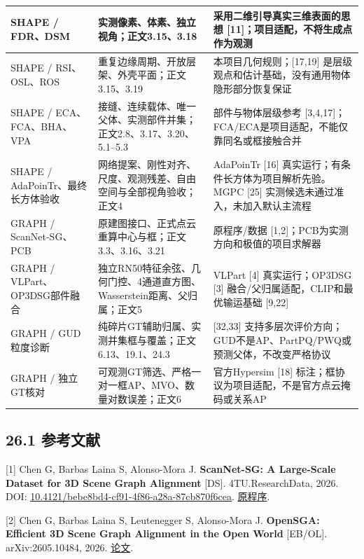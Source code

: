 \documentclass[UTF8,fontset=fandol]{ctexart}
\begin{document}
{\begin{longtable}{|p{}|p{}|p{}|}
SHAPE / FDR、DSM & 实测像素、体素、独立视角；正文3.15、3.18 & 采用二维引导真实三维表面的思想 [11]；项目适配，不将生成点作为观测 \\ \hline
SHAPE / RSI、OSL、ROS & 重复边缘周期、开放层架、外壳平面；正文3.15、3.19 & 本项目几何规则；[17,19] 是层级观点和估计基础，没有通用物体隐形部分恢复保证 \\ \hline
SHAPE / ECA、FCA、BHA、VPA & 接缝、连续载体、唯一父体、实测部件并集；正文2.8、3.17、3.20、5.1–5.3 & 部件与物体层级参考 [3,4,17]；FCA/ECA是项目适配，不能仅靠同名或框接触合并 \\ \hline
SHAPE / AdaPoinTr、最终长方体验收 & 网络提案、刚性对齐、尺度、观测残差、自由空间与全部视角验收；正文4 & AdaPoinTr [16] 真实运行；有条件长方体为项目解析先验。MGPC [25] 实测候选未通过准入，未加入默认主流程 \\ \hline
GRAPH / ScanNet-SG、PCB & 原建图接口、正式点云重算中心与框；正文3.3、3.16、3.21 & 原程序/数据 [1,2]；PCB为实测方向和极值的项目求解器 \\ \hline
GRAPH / VLPart、OP3DSG部件融合 & 独立RN50特征余弦、几何门控、4通道直方图、Wasserstein距离、父归属；正文5 & VLPart [4] 真实运行；OP3DSG [3] 融合/父归属适配，CLIP和最优输运基础 [9,22] \\ \hline
GRAPH / GUD粒度诊断 & 纯碎片GT辅助归属、实测并集框与覆盖；正文6.13、19.1、24.3 & [32,33] 支持多层次评价方向；GUD不是AP、PartPQ/PWQ或预测父体，不改变严格协议 \\ \hline
GRAPH / 独立GT核对 & 可观测GT筛选、严格一对一框AP、MVO、数量对数误差；正文6 & 官方Hypersim [18] 标注；框协议为项目适配，不是官方点云掩码或关系AP \\ \hline
\end{longtable}
}

\subsection*{26.1 参考文献}

[1] Chen G, Barbas Laina S, Alonso-Mora J. \textbf{ScanNet-SG: A Large-Scale Dataset for 3D Scene Graph Alignment} [DS]. 4TU.ResearchData, 2026. DOI: \href{https://data.4tu.nl/datasets/bebe8bd4-cf91-4f86-a28a-87cb870f6cea}{10.4121/bebe8bd4-cf91-4f86-a28a-87cb870f6cea}. \href{https://github.com/tud-amr/ScanNet-SG}{原程序}.



[2] Chen G, Barbas Laina S, Leutenegger S, Alonso-Mora J. \textbf{OpenSGA: Efficient 3D Scene Graph Alignment in the Open World} [EB/OL]. arXiv:2605.10484, 2026. \href{https://arxiv.org/abs/2605.10484}{论文}.
\end{document}
